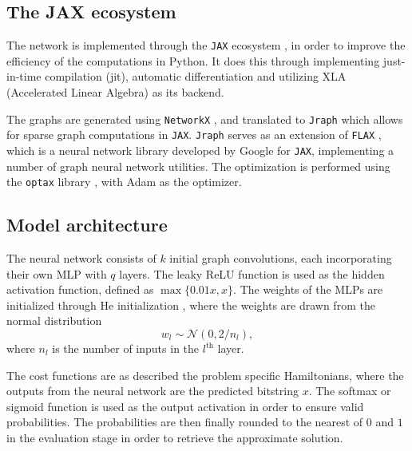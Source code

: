 \subsection{The JAX ecosystem}
The network is implemented through the \verb|JAX| ecosystem \cite{jax2018github}, in order to improve the efficiency of the computations in Python.
It does this through implementing just-in-time compilation (jit), automatic differentiation and utilizing XLA (Accelerated Linear Algebra) as its backend.

The graphs are generated using \verb|NetworkX| \cite{SciPyProceedings_11}, and translated to \verb|Jraph| \cite{jraph2020github} which allows for sparse graph computations in \verb|JAX|.
\verb|Jraph| serves as an extension of \verb|FLAX| \cite{flax2020github}, which is a neural network library developed by Google for \verb|JAX|, implementing a number of graph neural network utilities.
The optimization is performed using the \verb|optax| library \cite{deepmind2020jax}, with Adam \cite{kingma2017adam} as the optimizer.

\subsection{Model architecture}
The neural network consists of $k$ initial graph convolutions, each incorporating their own MLP with $q$ layers.
The leaky ReLU function is used as the hidden activation function, defined as $\max\{ 0.01x, x \}$.
The weights of the MLPs are initialized through He initialization \cite{he2015delving}, where the weights are drawn from the normal distribution
\begin{equation}
    w_l \sim \mathcal{N}(0, 2/n_l),
\end{equation}
where $n_l$ is the number of inputs in the $l^{\text{th}}$ layer.

The cost functions are as described the problem specific Hamiltonians, where the outputs from the neural network are the predicted bitstring $x$.
The softmax or sigmoid function is used as the output activation in order to ensure valid probabilities.
The probabilities are then finally rounded to the nearest of $0$ and $1$ in the evaluation stage in order to retrieve the approximate solution.
